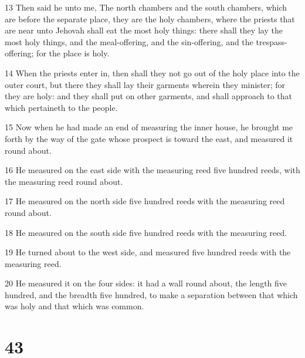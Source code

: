 \par 13 Then said he unto me, The north chambers and the south chambers, which are before the separate place, they are the holy chambers, where the priests that are near unto Jehovah shall eat the most holy things: there shall they lay the most holy things, and the meal-offering, and the sin-offering, and the trespass-offering; for the place is holy.
\par 14 When the priests enter in, then shall they not go out of the holy place into the outer court, but there they shall lay their garments wherein they minister; for they are holy: and they shall put on other garments, and shall approach to that which pertaineth to the people.
\par 15 Now when he had made an end of measuring the inner house, he brought me forth by the way of the gate whose prospect is toward the east, and measured it round about.
\par 16 He measured on the east side with the measuring reed five hundred reeds, with the measuring reed round about.
\par 17 He measured on the north side five hundred reeds with the measuring reed round about.
\par 18 He measured on the south side five hundred reeds with the measuring reed.
\par 19 He turned about to the west side, and measured five hundred reeds with the measuring reed.
\par 20 He measured it on the four sides: it had a wall round about, the length five hundred, and the breadth five hundred, to make a separation between that which was holy and that which was common.

\chapter{43}

